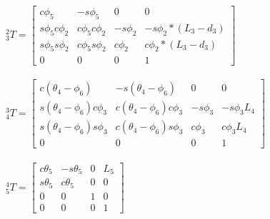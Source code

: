 \documentclass{article}
\begin{document}
${}^{2}_{3}T=
\begin{bmatrix}
c\phi_5 & -s\phi_5 & 0 & 0\\
s\phi_5c\phi_2 & c\phi_5c\phi_2 & -s\phi_2 & -s\phi_2*(L_3-d_3)\\
s\phi_5s\phi_2 & c\phi_5s\phi_2 & c\phi_2 & c\phi_2*(L_3-d_3)\\
0 & 0 & 0 & 1
\end{bmatrix}$\\\\
${}^{3}_{4}T=
\begin{bmatrix}
c(\theta_4-\phi_6) & -s(\theta_4-\phi_6) & 0 & 0\\
s(\theta_4-\phi_6)c\phi_3 & c(\theta_4-\phi_6)c\phi_3 & -s\phi_3 & -s\phi_3L_4\\
s(\theta_4-\phi_6)s\phi_3 & c(\theta_4-\phi_6)s\phi_3 & c\phi_3 & c\phi_3L_4\\
0 & 0 & 0 & 1
\end{bmatrix}$\\\\
${}^{4}_{5}T=
\begin{bmatrix}
c\theta_5 & -s\theta_5 & 0 & L_5\\
s\theta_5 & c\theta_5 & 0 & 0\\
0 & 0 & 1 & 0\\
0 & 0 & 0 & 1
\end{bmatrix}$
\end{document}
